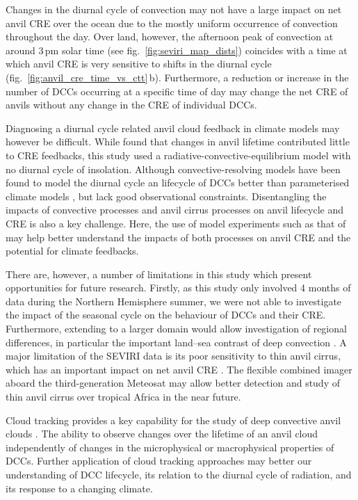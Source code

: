 \documentclass[acp, manuscript]{copernicus}
\begin{document}
Changes in the diurnal cycle of convection may not have a large impact on net anvil CRE over the ocean due to the mostly uniform occurrence of convection throughout the day.
Over land, however, the afternoon peak of convection at around 3\,pm solar time (see fig.~\ref{fig:seviri_map_dists}) coincides with a time at which anvil CRE is very sensitive to shifts in the diurnal cycle (fig.~\ref{fig:anvil_cre_time_vs_ctt}\,b).
Furthermore, a reduction or increase in the number of DCCs occurring at a specific time of day may change the net CRE of anvils without any change in the CRE of individual DCCs.

Diagnosing a diurnal cycle related anvil cloud feedback in climate models may however be difficult.
While \citet{beydoun_dissecting_2021} found that changes in anvil lifetime contributed little to CRE feedbacks, this study used a radiative-convective-equilibrium model with no diurnal cycle of insolation.
Although convective-resolving models have been found to model the diurnal cycle an lifecycle of DCCs better than parameterised climate models \citep{prein_review_2015, feng_mesoscale_2023}, but lack good observational constraints.
Disentangling the impacts of convective processes and anvil cirrus processes on anvil lifecycle and CRE is also a key challenge.
Here, the use of model experiments such as that of \citet{gasparini_diurnal_2022} may help better understand the impacts of both processes on anvil CRE and the potential for climate feedbacks.

There are, however, a number of limitations in this study which present opportunities for future research. 
Firstly, as this study only involved 4 months of data during the Northern Hemisphere summer, we were not able to investigate the impact of the seasonal cycle on the behaviour of DCCs and their CRE. 
Furthermore, extending to a larger domain would allow investigation of regional differences, in particular the important land--sea contrast of deep convection \citep{takahashi_revisiting_2023}. 
A major limitation of the SEVIRI data is its poor sensitivity to thin anvil cirrus, which has an important impact on net anvil CRE \citep{protopapadaki_upper_2017, horner_evolution_2023}.
The flexible combined imager \citep{martin_fci_2021} aboard the third-generation Meteosat may allow better detection and study of thin anvil cirrus over tropical Africa in the near future.

Cloud tracking provides a key capability for the study of deep convective anvil clouds \citep{gasparini_opinion_2023b}.
The ability to observe changes over the lifetime of an anvil cloud independently of changes in the microphysical or macrophysical properties of DCCs.
Further application of cloud tracking approaches may better our understanding of DCC lifecycle, its relation to the diurnal cycle of radiation, and its response to a changing climate.
\end{document}
